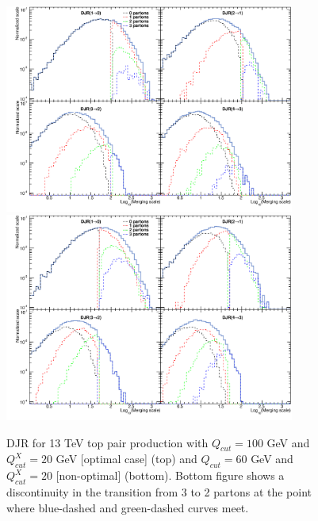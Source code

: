 \begin{figure}[!Hhtbp]
  \begin{center}
    \includegraphics[width=0.85\textwidth]{figs/DJR_q100_xq20_TTJets13TeV.png}
    \includegraphics[width=0.85\textwidth]{figs/DJR_q50_xq20_TTJets13TeV.png}
    \caption{DJR for 13 TeV top pair production with $Q_{cut}=100$ GeV and $Q^{X}_{cut}=20$ GeV [optimal case] (top) and $Q_{cut}=60$ GeV and $Q^{X}_{cut}=20$ [non-optimal] (bottom). Bottom figure shows a discontinuity in the transition from 3 to 2 partons at the point where blue-dashed and green-dashed curves meet.}
    \label{fig:TTJetsMerging}
  \end{center}
\end{figure}

